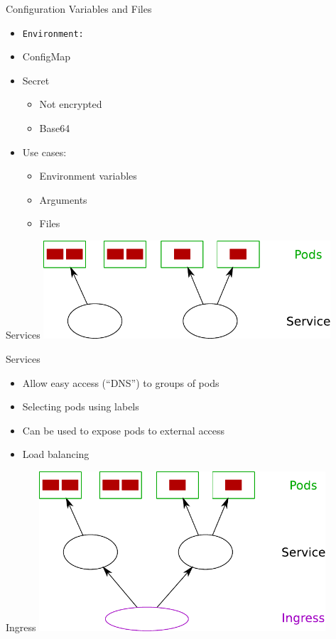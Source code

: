 \documentclass{dcpresentation}
\begin{document}
 \begin{frame}{Configuration Variables and Files}
   \begin{itemize}
    \item \texttt{Environment:}
    \item ConfigMap
    \item Secret
    \begin{itemize}
     \item Not encrypted
     \item Base64
    \end{itemize}
    \item Use cases:
    \begin{itemize}
     \item Environment variables
     \item Arguments
     \item Files
    \end{itemize}
   \end{itemize}
 
 \end{frame}
 
 \begin{frame}{Services}
  \centering
  \includegraphics[width=0.8\textwidth]{img/arch-ps.pdf}
 \end{frame}
 
 \begin{frame}{Services}
  \begin{itemize}
   \item Allow easy access (``DNS'') to groups of pods
   \item Selecting pods using labels
   \item Can be used to expose pods to external access
   \item Load balancing
  \end{itemize}
 \end{frame}


 \begin{frame}{Ingress}
  \centering
  \includegraphics[width=0.8\textwidth]{img/arch-psi.pdf}
 \end{frame}
 
\end{document}
